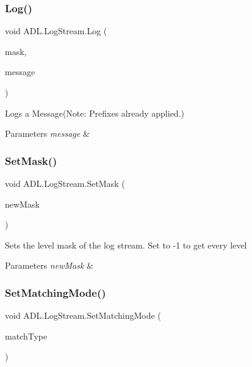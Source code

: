 \subsubsection{\texorpdfstring{Log()}{Log()}}
{\footnotesize\ttfamily void A\+D\+L.\+Log\+Stream.\+Log (\begin{DoxyParamCaption}\item[{int}]{mask,  }\item[{string}]{message }\end{DoxyParamCaption})}



Logs a Message(Note\+: Prefixes already applied.) 


\begin{DoxyParams}{Parameters}
{\em message} & \\
\hline
\end{DoxyParams}
\mbox{\label{class_a_d_l_1_1_log_stream_a7a1a25f0247d4ebfeb5a4d6e37fe4e3a}} 
\subsubsection{\texorpdfstring{Set\+Mask()}{SetMask()}}
{\footnotesize\ttfamily void A\+D\+L.\+Log\+Stream.\+Set\+Mask (\begin{DoxyParamCaption}\item[{int}]{new\+Mask }\end{DoxyParamCaption})}



Sets the level mask of the log stream. Set to -\/1 to get every level 


\begin{DoxyParams}{Parameters}
{\em new\+Mask} & \\
\hline
\end{DoxyParams}
\mbox{\label{class_a_d_l_1_1_log_stream_af66833a158ebb7d8e079810bb2b8f50e}} 
\subsubsection{\texorpdfstring{Set\+Matching\+Mode()}{SetMatchingMode()}}
{\footnotesize\ttfamily void A\+D\+L.\+Log\+Stream.\+Set\+Matching\+Mode (\begin{DoxyParamCaption}\item[{\mbox{\hyperlink{namespace_a_d_l_af6334296dbae0383a652317263f0bc05}{Match\+Type}}}]{match\+Type }\end{DoxyParamCaption})}



